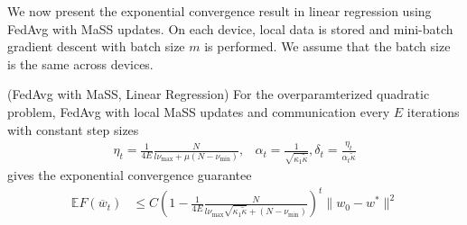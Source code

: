 	We now present the exponential convergence result in linear regression
	using FedAvg with MaSS updates. On each device, local data is stored
	and mini-batch gradient descent with batch size $m$ is performed.
	We assume that the batch size is the same across devices. 
	\begin{thm}
	(FedAvg with MaSS, Linear Regression) For the overparamterized quadratic
	problem, FedAvg with local MaSS updates and communication every $E$
	iterations with constant step sizes 
	\begin{align*}
	\eta_{t}=\frac{1}{4E}\frac{N}{l\nu_{\max}+\mu(N-\nu_{\min})}, & \alpha_{t}=\frac{1}{\sqrt{\kappa_{1}\tilde{\kappa}}},\delta_{t}=\frac{\eta_{t}}{\alpha_{t}\tilde{\kappa}}
	\end{align*}
	gives the exponential convergence guarantee 
	\begin{align*}
	\mathbb{E}F(\overline{w}_{t}) & \leq C(1-\frac{1}{4E}\frac{N}{l\nu_{\max}\sqrt{\kappa_{1}\tilde{\kappa}}+(N-\nu_{\min})})^{t}\|w_{0}-w^{\ast}\|^{2}
	\end{align*}
	\end{thm}
